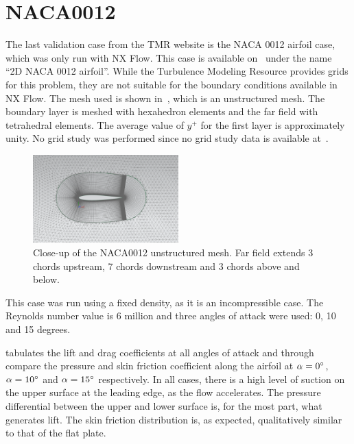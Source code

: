 \section{NACA0012}
The last validation case from the TMR website is the NACA 0012 airfoil case, which was only run with NX Flow. This case is available on~\cite{tmr} under the name ``2D NACA 0012 airfoil''. While the Turbulence Modeling Resource provides grids for this problem, they are not suitable for the boundary conditions available in NX Flow. The mesh used is shown in~, which is an unstructured mesh. The boundary layer is meshed with hexahedron elements and the far field with tetrahedral elements. The average value of $y^+$ for the first layer is approximately unity. No grid study was performed since no grid study data is available at~\cite{tmr}.
\begin{figure}
    \centering
    \includegraphics[width=0.5\textwidth]{figs/naca0012/naca0012.png}
    \caption{Close-up of the NACA0012 unstructured mesh. Far field extends 3 chords upstream, 7 chords downstream and 3 chords above and below.}
    \label{fig:naca0012}
\end{figure}
This case was run using a fixed density, as it is an incompressible case. The Reynolds number value is 6 million and three angles of attack were used: 0, 10 and 15 degrees.

 tabulates the lift and drag coefficients at all angles of attack and  through  compare the pressure and skin friction coefficient along the airfoil at $\alpha=0^\circ$, $\alpha=10^\circ$ and $\alpha=15^\circ$ respectively. In all cases, there is a high level of suction on the upper surface at the leading edge, as the flow accelerates. The pressure differential between the upper and lower surface is, for the most part, what generates lift. The skin friction distribution is, as expected, qualitatively similar to that of the flat plate.

